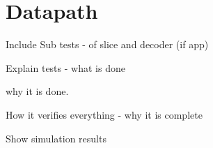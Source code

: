 
\section{Datapath}

Include Sub tests - of slice and decoder (if app)

Explain tests - what is done

why it is done.

How it verifies everything - why it is complete

Show simulation results

